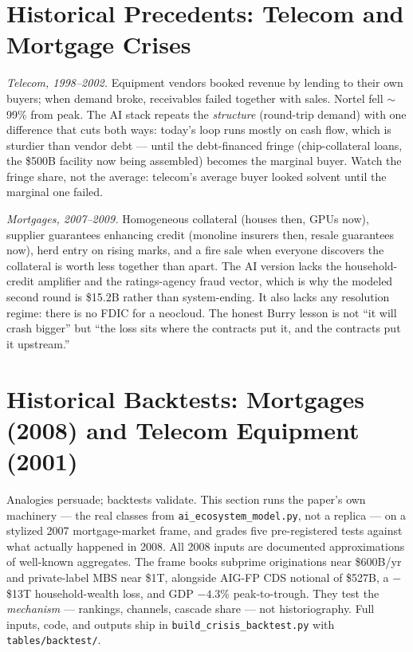 \documentclass[11pt,a4paper]{article}
\begin{document}
\section{Historical Precedents: Telecom and Mortgage Crises}\label{sec:precedents}
\emph{Telecom, 1998--2002.} Equipment vendors booked revenue by lending to
their own buyers; when demand broke, receivables failed together with sales.
Nortel fell $\sim$99\% from peak. The AI stack repeats the \emph{structure}
(round-trip demand) with one difference that cuts both ways: today's loop
runs mostly on cash flow, which is sturdier than vendor debt --- until the
debt-financed fringe (chip-collateral loans, the \$500B facility now being
assembled) becomes the marginal buyer. Watch the fringe share, not the
average: telecom's average buyer looked solvent until the marginal one
failed.

\emph{Mortgages, 2007--2009.} Homogeneous collateral (houses then, GPUs
now), supplier guarantees enhancing credit (monoline insurers then, resale
guarantees now), herd entry on rising marks, and a fire sale when everyone
discovers the collateral is worth less together than apart. The AI version
lacks the household-credit amplifier and the ratings-agency fraud vector,
which is why the modeled second round is \$15.2B rather than system-ending.
It also lacks any resolution regime: there is no FDIC for a neocloud.
The honest Burry lesson is not ``it will crash bigger'' but ``the loss sits
where the contracts put it, and the contracts put it upstream.''

\section{Historical Backtests: Mortgages (2008) and Telecom Equipment (2001)}\label{sec:backtest}
Analogies persuade; backtests validate. This section runs the paper's own
machinery --- the real classes from \texttt{ai\_ecosystem\_model.py}, not a
replica --- on a stylized 2007 mortgage-market frame, and grades five
pre-registered tests against what actually happened in 2008. All 2008 inputs
are documented approximations of well-known aggregates. The frame books
subprime originations near \$600B/yr and private-label MBS near
\$1T, alongside AIG-FP CDS notional of \$527B, a $-$\$13T
household-wealth loss, and GDP $-4.3\%$ peak-to-trough. They test the
\emph{mechanism} --- rankings, channels, cascade share --- not
historiography. Full inputs, code, and outputs ship in
\texttt{build\_crisis\_backtest.py} with \texttt{tables/backtest/}.
\end{document}

